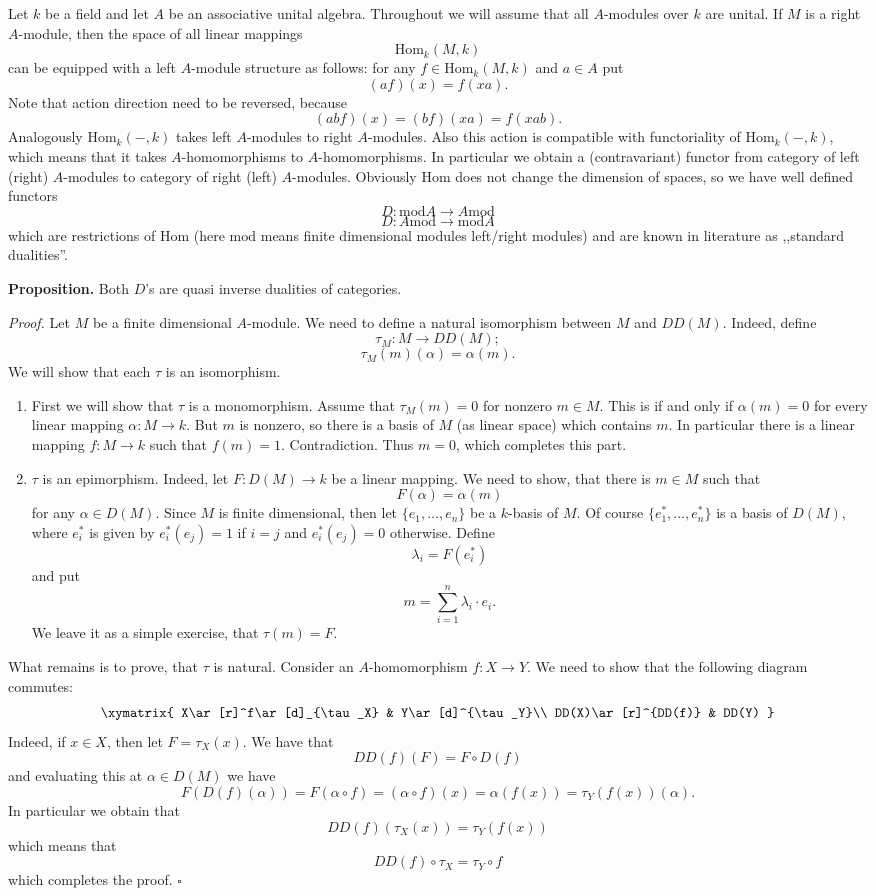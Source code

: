 \documentclass[12pt]{article}
\begin{document}
Let $k$ be a field and let $A$ be an associative unital algebra. Throughout we will assume that all $A$-modules over $k$ are unital. If $M$ is a right $A$-module, then the space of all linear mappings
$$\mathrm{Hom}_{k}(M,k)$$
can be equipped with a left $A$-module structure as follows: for any $f\in\mathrm{Hom}_{k}(M,k)$ and $a\in A$ put
$$(af)(x)=f(xa).$$
Note that action direction need to be reversed, because
$$(abf)(x)=(bf)(xa)=f(xab).$$
Analogously $\mathrm{Hom}_{k}(-,k)$ takes left $A$-modules to right $A$-modules. Also this action is compatible with functoriality of $\mathrm{Hom}_{k}(-,k)$, which means that it takes $A$-homomorphisms to $A$-homomorphisms. In particular we obtain a (contravariant) functor from category of left (right) $A$-modules to category of right (left) $A$-modules. Obviously $\mathrm{Hom}$ does not change the dimension of spaces, so we have well defined functors
$$D:\mathrm{mod}A\to A\mathrm{mod}$$
$$D:A\mathrm{mod}\to \mathrm{mod}A$$
which are restrictions of $\mathrm{Hom}$ (here $\mathrm{mod}$ means finite dimensional modules left/right modules) and are known in literature as ,,standard dualities''.

\textbf{Proposition.} Both $D$'s are quasi inverse dualities of categories.

\textit{Proof.} Let $M$ be a finite dimensional $A$-module. We need to define a natural isomorphism between $M$ and $DD(M)$. Indeed, define
$$\tau_M:M\to DD(M);$$
$$\tau_M(m)(\alpha)=\alpha(m).$$
We will show that each $\tau$ is an isomorphism.
\begin{enumerate}
\item First we will show that $\tau$ is a monomorphism. Assume that $\tau_M(m)=0$ for nonzero $m\in M$. This is if and only if $\alpha(m)=0$ for every linear mapping $\alpha:M\to k$. But $m$ is nonzero, so there is a basis of $M$ (as linear space) which contains $m$. In particular there is a linear mapping $f:M\to k$ such that $f(m)=1$. Contradiction. Thus $m=0$, which completes this part.
\item $\tau$ is an epimorphism. Indeed, let $F:D(M)\to k$ be a linear mapping. We need to show, that there is $m\in M$ such that 
$$F(\alpha)=\alpha(m)$$
for any $\alpha\in D(M)$. Since $M$ is finite dimensional, then let $\{e_1,\ldots,e_n\}$ be a $k$-basis of $M$. Of course $\{e_1^*,\ldots,e_n^*\}$ is a basis of $D(M)$, where $e_i^*$ is given by $e_i^*(e_j)=1$ if $i=j$ and $e_i^*(e_j)=0$ otherwise. Define
$$\lambda_i=F(e_i^*)$$
and put
$$m=\sum_{i=1}^n\lambda_i\cdot e_i.$$
We leave it as a simple exercise, that $\tau(m)=F$.
\end{enumerate}
What remains is to prove, that $\tau$ is natural. Consider an $A$-homomorphism $f:X\to Y$. We need to show that the following diagram commutes:
$$\xymatrix{
X\ar[r]^f\ar[d]_{\tau_X} & Y\ar[d]^{\tau_Y}\\
DD(X)\ar[r]^{DD(f)} & DD(Y)
}$$
Indeed, if $x\in X$, then let $F=\tau_X(x)$. We have that 
$$DD(f)(F)=F\circ D(f)$$
and evaluating this at $\alpha\in D(M)$ we have
$$F(D(f)(\alpha))=F(\alpha\circ f)=(\alpha\circ f)(x)=\alpha(f(x)) = \tau_Y(f(x))(\alpha).$$
In particular we obtain that
$$DD(f)(\tau_X(x))=\tau_Y(f(x))$$
which means that
$$DD(f)\circ\tau_X=\tau_Y\circ f$$
which completes the proof. $\square$
\end{document}
